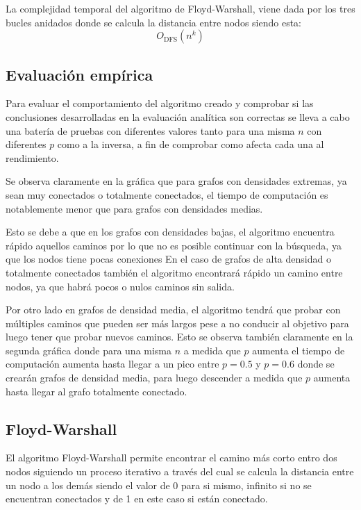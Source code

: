 La complejidad temporal del algoritmo de Floyd-Warshall, viene dada por los tres bucles anidados donde se calcula la distancia entre nodos  siendo esta:
\begin{equation}
    O_{\mathrm{DFS}}(n^k) 
\end{equation}

\subsection*{Evaluación empírica}

Para evaluar el comportamiento del algoritmo creado y comprobar si las conclusiones desarrolladas en la evaluación analítica son correctas se lleva a cabo una batería de pruebas con diferentes valores tanto para una misma $n$ con diferentes $p$ como a la inversa, a fin de comprobar como afecta cada una al rendimiento.


Se observa claramente en la gráfica que para grafos con densidades extremas, ya sean muy conectados o totalmente conectados, el tiempo de computación es notablemente menor que para grafos con densidades medias.

Esto se debe a que en los grafos con densidades bajas, el algoritmo encuentra rápido aquellos caminos por lo que no es posible continuar con la búsqueda, ya que los nodos tiene pocas conexiones  En el caso de grafos de alta densidad o totalmente conectados también el algoritmo encontrará rápido un camino entre nodos, ya que habrá pocos o nulos caminos sin salida.

Por otro lado en grafos de densidad media, el algoritmo tendrá que probar con múltiples caminos que pueden ser más largos pese a no conducir al objetivo para luego tener que probar nuevos caminos.
Esto se observa también claramente en la segunda gráfica donde para una misma $n$ a medida que $p$ aumenta el tiempo de computación aumenta hasta llegar a un pico entre $p=0.5$ y $p=0.6$ donde se crearán grafos de densidad media, para luego descender a medida que $p$ aumenta hasta llegar al grafo totalmente conectado.



\subsection{Floyd-Warshall}\label{subsec:fw}

El algoritmo Floyd-Warshall\supercite{FloydRobertW.1962A9Sp} permite encontrar el camino más corto entro dos nodos siguiendo un proceso iterativo a través del cual se calcula la distancia entre un nodo a los demás siendo el valor de 0 para si mismo, infinito si no se encuentran conectados y de 1 en este caso si están conectado. 

